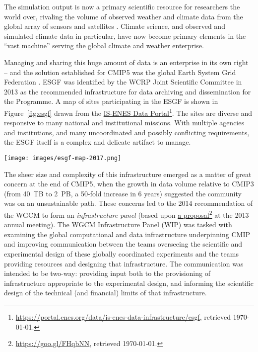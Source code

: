 \documentclass[gmd,manuscript]{copernicus}
\newcommand{\pllabel}[1]{\label{p-#1}\linelabel{l-#1}}
\newcommand{\urlref}[2] {\href{#1}{#2}\footnote{\url{#1}, retrieved \today.}}
\begin{document}
The simulation output is now a primary scientific resource for
researchers the world over, rivaling the volume of observed weather
and climate data from the global array of sensors and satellites
\citep{ref:overpecketal2011}. Climate science, and observed and simulated
climate data in particular, have now become primary elements in the
``vast machine'' \citep{ref:edwards2010} serving the global climate and
weather enterprise.

Managing and sharing this huge amount of data is an enterprise in its
own right -- and the solution established for CMIP5 was the global
Earth System Grid Federation
\citep[ESGF,][]{ref:williamsetal2011a,ref:williamsetal2015}. ESGF was
identified by the WCRP Joint Scientific Committee in 2013 as the
recommended infrastructure for data archiving and dissemination for
the Programme.
\pllabel{RC2-12}
A map of sites participating in the ESGF is shown in
\pllabel{RC2-8}
Figure~\ref{fig:esgf} drawn from the
\urlref{https://portal.enes.org/data/is-enes-data-infrastructure/esgf}{IS-ENES
  Data Portal}. The sites are diverse and responsive to many national
and institutional missions. With multiple agencies and institutions,
and many uncoordinated and possibly conflicting requirements, the ESGF
itself is a complex and delicate
\pllabel{RC2-10}
artifact to manage.

\begin{figure*}
  \begin{center}
    \texttt{[image: images/esgf-map-2017.png]}
  \end{center}
  \caption{Sites participating in the Earth System Grid Federation in
    May 2017. Figure courtesy IS-ENES Data Portal. }
  \label{fig:esgf}
\end{figure*}

The sheer size and complexity of this infrastructure emerged as a
matter of great concern at the end of CMIP5, when the growth in data
volume relative to CMIP3 (from 40~TB to 2~PB, a 50-fold increase in 6
years) suggested the community was on an unsustainable path. These
concerns led to the 2014 recommendation of the WGCM to form an
\emph{infrastructure panel} (based upon
\pllabel{RC2-11}
\urlref{https://goo.gl/FHqbNN}{a proposal} at the 2013 annual
meeting). The WGCM Infrastructure Panel (WIP) was tasked with
examining the global computational and data infrastructure
underpinning CMIP and improving communication between the teams
overseeing the scientific and experimental design of these globally
coordinated experiments and the teams providing resources and
designing that infrastructure. The communication was intended to be
two-way: providing input both to the provisioning of infrastructure
appropriate to the experimental design, and informing the scientific
design of the technical (and financial) limits of that infrastructure.
\end{document}
